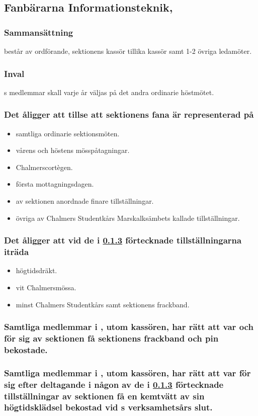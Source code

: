 \subsection{Fanbärarna Informationsteknik, \FANBARERIT}
\subsubsection{Sammansättning}
\FANBARERIT{} består av ordförande, sektionens kassör tillika kassör samt 1-2 övriga ledamöter.

\subsubsection{Inval}
\FANBARERIT{}s medlemmar skall varje år väljas på det andra ordinarie höstmötet.

\subsubsection{Det åligger \FANBARERIT att tillse att sektionens fana är representerad på}
\label{sec:fanbarerit:function}
\begin{itemize}
	\item samtliga ordinarie sektionsmöten.
	\item vårens och höstens mösspåtagningar.
	\item Chalmerscortègen.
	\item första mottagningsdagen.
	\item av sektionen anordnade finare tillställningar.
	\item övriga av Chalmers Studentkårs Marskalksämbets kallade tillställningar.
\end{itemize}

\subsubsection{Det åligger \FANBARERIT{} att vid de i \ref{sec:fanbarerit:function} förtecknade tillställningarna iträda}
\begin{itemize}
	\item högtidsdräkt.
	\item vit Chalmersmössa.
	\item minst Chalmers Studentkårs samt sektionens frackband.
\end{itemize}

\subsubsection{Samtliga medlemmar i \FANBARERIT{}, utom kassören, har rätt att var och för sig av sektionen få sektionens frackband och pin bekostade.}

\subsubsection{Samtliga medlemmar i \FANBARERIT{}, utom kassören, har rätt att var för sig efter deltagande i någon av de i \ref{sec:fanbarerit:function} förtecknade tillställningar av sektionen få en kemtvätt av sin högtidsklädsel bekostad vid \FANBARERIT{}s verksamhetsårs slut.}

